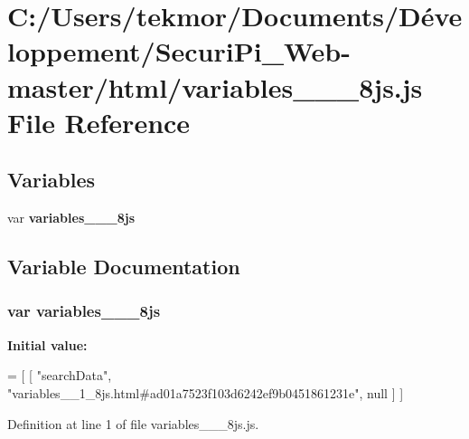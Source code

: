 \section{C\+:/\+Users/tekmor/\+Documents/\+Développement/\+Securi\+Pi\+\_\+\+Web-\/master/html/variables\+\_\+\+\_\+\_\+8js.js File Reference}
\label{variables____1__8js_8js}
\subsection*{Variables}
\begin{DoxyCompactItemize}
\item 
var {\bf variables\+\_\+\+\_\+\_\+8js}
\end{DoxyCompactItemize}


\subsection{Variable Documentation}
\subsubsection[{variables\+\_\+\+\_\+1\+\_\+8js}]{\setlength{\rightskip}{0pt plus 5cm}var variables\+\_\+\+\_\+\_\+8js}\label{variables____1__8js_8js_a6a84d3eca74675ceafa89855b8591c45}
{\bfseries Initial value\+:}
\begin{DoxyCode}
=
[
    [ \textcolor{stringliteral}{"searchData"}, \textcolor{stringliteral}{"variables\_\_1\_8js.html#ad01a7523f103d6242ef9b0451861231e"}, null ]
]
\end{DoxyCode}


Definition at line 1 of file variables\+\_\+\+\_\+\_\+8js.\+js.

